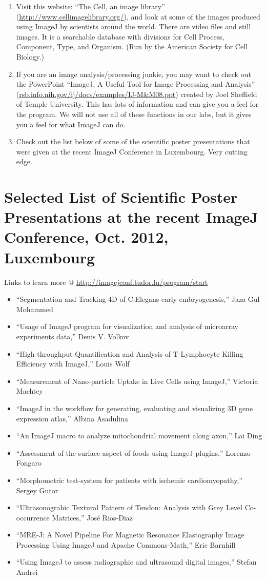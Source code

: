 \begin{enumerate}
\item Visit this website: ``The Cell, an image library'' (\url{http://www.cellimagelibrary.org/}), and look at some of the images produced using ImageJ by scientists around the world. There are video files and still images. It is a searchable database with divisions for Cell Process, Component, Type, and Organism. (Run by the American Society for Cell Biology.)
\item If you are an image analysis/processing junkie, you may want to check out the PowerPoint ``ImageJ, A Useful Tool for Image Processing and Analysis'' (\url{rsb.info.nih.gov/ij/docs/examples/IJ-M&M08.ppt}) created by Joel Sheffield of Temple University. This has lots of information and can give you a feel for the program. We will not use all of these functions in our labs, but it gives you a feel for what ImageJ can do.
\item Check out the list below of some of the scientific poster presentations that were given at the recent ImageJ Conference in Luxembourg. Very cutting edge.
\end{enumerate}

\section*{Selected List of Scientific Poster Presentations at the recent ImageJ Conference, Oct. 2012, Luxembourg}
Links to learn more @ \url{http://imagejconf.tudor.lu/program/start}
\begin{itemize}
\item ``Segmentation and Tracking 4D of C.Elegans early embryogenesis,'' Jaza Gul Mohammed
\item ``Usage of ImageJ program for visualization and analysis of microarray experiments data,'' Denis V. Volkov
\item ``High-throughput Quantification and Analysis of T-Lymphocyte Killing Efficiency with ImageJ,'' Louis Wolf
\item ``Measurement of Nano-particle Uptake in Live Cells using ImageJ,'' Victoria Machtey
\item ``ImageJ in the workflow for generating, evaluating and visualizing 3D gene expression atlas,'' Albina Asadulina
\item ``An ImageJ macro to analyze mitochondrial movement along axon,'' Lai Ding
\item ``Assessment of the surface aspect of foods using ImageJ plugins,'' Lorenzo Fongaro
\item ``Morphometric test-system for patients with ischemic cardiomyopathy,'' Sergey Gutor
\item ``Ultrasonograhic Textural Pattern of Tendon: Analysis with Grey Level Co-occurrence Matrices,'' José Rios-Diaz
\item ``MRE-J: A Novel Pipeline For Magnetic Resonance Elastography Image Processing Using ImageJ and Apache Commons-Math,'' Eric Barnhill
\item ``Using ImageJ to assess radiographic and ultrasound digital images,'' Stefan Andrei
\end{itemize}